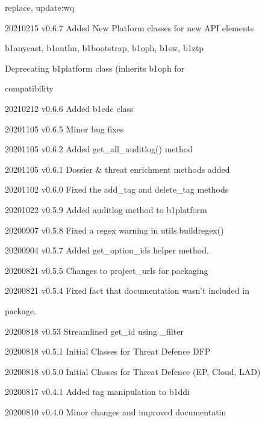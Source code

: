 \documentclass[letterpaper,10pt,english]{sphinxmanual}
\begin{document}
\begin{DUlineblock}{0em}
\item[]
\begin{DUlineblock}{\DUlineblockindent}
\item[] replace, update:wq
\end{DUlineblock}
\item[] 20210215    v0.6.7  Added New Platform classes for new API elements
\item[]
\begin{DUlineblock}{\DUlineblockindent}
\item[] b1anycast, b1authn, b1bootstrap, b1oph, b1sw, b1ztp
\item[] Deprecating b1platform class (inherits b1oph for
\item[] compatibility
\end{DUlineblock}
\item[] 20210212    v0.6.6  Added b1cdc class
\item[] 20201105    v0.6.5  Minor bug fixes
\item[] 20201105    v0.6.2  Added get\_all\_auditlog() method
\item[] 20201105    v0.6.1  Dossier \& threat enrichment methods added
\item[] 20201102    v0.6.0  Fixed the add\_tag and delete\_tag methods
\item[] 20201022    v0.5.9  Added auditlog method to b1platform
\item[] 20200907    v0.5.8  Fixed a regex warning in utils.buildregex()
\item[] 20200904    v0.5.7  Added get\_option\_ids helper method.
\item[] 20200821    v0.5.5  Changes to project\_urls for packaging
\item[] 20200821    v0.5.4  Fixed fact that documentation wasn’t included in
\item[]
\begin{DUlineblock}{\DUlineblockindent}
\item[] package.
\end{DUlineblock}
\item[] 20200818    v0.53   Streamlined get\_id using \_filter
\item[] 20200818    v0.5.1  Initial Classes for Threat Defence DFP
\item[] 20200818    v0.5.0  Initial Classes for Threat Defence (EP, Cloud, LAD)
\item[] 20200817    v0.4.1  Added tag manipulation to b1ddi
\item[] 20200810    v0.4.0  Minor changes and improved documentatin

\end{DUlineblock}
\end{document}
